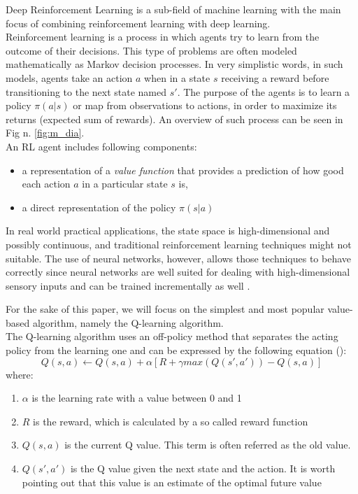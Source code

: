 \documentclass[conference]{IEEEtran}
\begin{document}
Deep Reinforcement Learning is a sub-field of machine learning with the main focus of combining reinforcement learning with deep learning. \\
Reinforcement learning is a process in which agents try to learn from the outcome of their decisions. This type of problems are often modeled mathematically as Markov decision processes. In very simplistic words, in such models, agents take an action $a$ when in a state $s$ receiving a reward before transitioning to the next state named $s'$. The purpose of the agents is to learn a policy $\pi(a|s)$ or map from observations to actions, in order to maximize its returns (expected sum of rewards)\cite{DBLP:journals/corr/Li17b}. An overview of such process can be seen in Fig n. \ref{fig:m_dia}. \\
An RL agent includes following components:
\begin{itemize}
    \item  a representation of a \textit{value function} that provides a prediction of how good each action $a$ in a particular state $s$ is,
    \item a direct representation of the policy $\pi(s|a)$
\end{itemize}

In real world practical applications, the state space is high-dimensional and possibly continuous, and traditional reinforcement learning techniques might not suitable. The use of neural networks, however, allows those techniques to behave correctly since neural networks are well suited for dealing with high-dimensional sensory inputs and can be trained incrementally as well \cite{DBLP:journals/corr/Li17b}.



For the sake of this paper, we will focus on the simplest and most popular value-based algorithm, namely the Q-learning algorithm. \\
The Q-learning algorithm uses an off-policy method that separates the acting policy from the learning one and can be expressed by the following equation (\cite{Q_learning}):
\begin{equation}
    Q(s,a) \leftarrow Q(s,a) + \alpha [R + \gamma max( Q(s',a')) - Q(s,a)]
    \label{q_value}
\end{equation}
where:
\begin{enumerate}
    \item $\alpha$ is the learning rate with a value between 0 and 1
    \item $R$ is the reward, which is calculated by a so called reward function
    \item $Q(s,a)$ is the current Q value. This term is often referred as the old value.
    \item $Q(s',a')$ is the Q value given the next state and the action. It is worth pointing out that this value is an estimate of the optimal future value
    
\end{enumerate}
\end{document}
